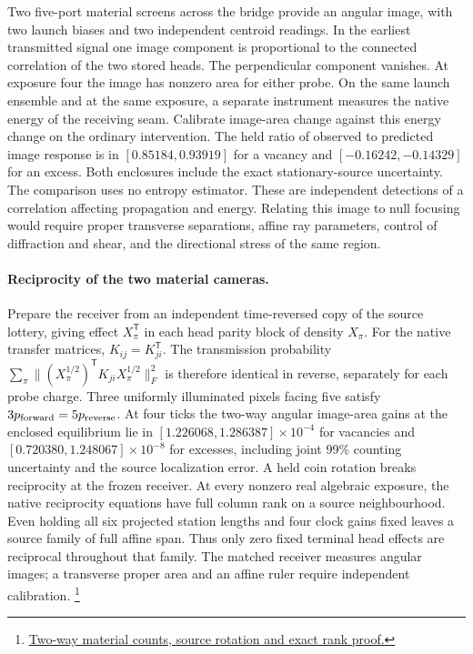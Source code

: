 \documentclass[11pt]{article}
\begin{document}
Two five-port material screens across the bridge provide an angular
image, with two launch biases and two independent centroid readings.
In the earliest transmitted signal one image component is
proportional to the connected correlation of the two stored heads.
The perpendicular component vanishes. At exposure four the image
has nonzero area for either probe. On the same launch ensemble and
at the same exposure, a separate instrument measures the native
energy of the receiving seam. Calibrate image-area change against
this energy change on the ordinary intervention. The held ratio of
observed to predicted image response is in \([0.85184,0.93919]\)
for a vacancy and \([-0.16242,-0.14329]\) for an excess. Both
enclosures include the exact stationary-source uncertainty.
The comparison uses no entropy estimator.
These are independent detections of a correlation affecting
propagation and energy. Relating this image to null focusing would
require proper transverse separations, affine ray parameters,
control of diffraction and shear, and the directional stress of
the same region.

\paragraph{Reciprocity of the two material cameras.}
Prepare the receiver from an independent time-reversed copy of the
source lottery, giving effect $X_\pi^{\mathsf T}$ in each head parity
block of density $X_\pi$. For the native transfer matrices,
$K_{ij}=K_{ji}^{\mathsf T}$. The transmission probability
$\sum_\pi\| (X_\pi^{1/2})^{\mathsf T} K_{ji} X_\pi^{1/2}\|_F^2$
is therefore identical in reverse, separately for each probe charge.
Three uniformly illuminated pixels facing five satisfy
$3p_{\rm forward}=5p_{\rm reverse}$. At four ticks the two-way
angular image-area gains at the enclosed equilibrium lie in
$[1.226068,1.286387]\times10^{-4}$ for vacancies and
$[0.720380,1.248067]\times10^{-8}$ for excesses, including joint
99\% counting uncertainty and the source localization error. A held coin rotation breaks reciprocity at the frozen
receiver. At every nonzero real algebraic exposure, the native
reciprocity equations have full column rank on a source neighbourhood.
Even holding all six projected station lengths and four clock gains
fixed leaves a source family of full affine span. Thus only zero fixed
terminal head effects are reciprocal throughout that family. The matched receiver measures angular images;
a transverse proper area and an affine ruler require independent
calibration.%
\footnote{\href{https://github.com/FloatingPragma/observer-patch-holography/tree/main/code/matched_einstein_limit/source_implication/full_geometry/station_balls/reciprocal_screen}{Two-way material counts, source rotation and exact rank proof.}}
\end{document}
